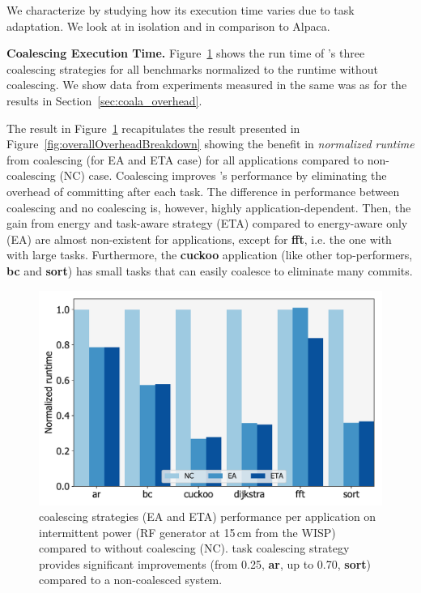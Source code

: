 We characterize \sys by studying how its execution time varies due to task adaptation. We look at \sys in isolation and in comparison to Alpaca.

\textbf{\sys Coalescing Execution Time.}  Figure~\ref{fig:coalescing} shows the run time of \sys's three coalescing strategies for all benchmarks normalized to the \sys runtime without coalescing. We show data from experiments measured in the same was as for the results in Section~\ref{sec:coala_overhead}. 

The result in Figure~\ref{fig:coalescing} recapitulates the result presented in Figure~\ref{fig:overallOverheadBreakdown} showing the benefit in \emph {normalized runtime} from coalescing (for EA and ETA case) for all applications compared to non-coalescing (NC) case. Coalescing improves \sys's performance by eliminating the overhead of committing after each task. The difference in performance between coalescing and no coalescing is, however, highly application-dependent. Then, the gain from energy and task-aware strategy (ETA) compared to energy-aware only (EA) are almost non-existent for applications, except for \textbf{fft}, i.e. the one with with large tasks. Furthermore, the \textbf{cuckoo} application (like other top-performers, \textbf{bc} and \textbf{sort}) has small tasks that \sys can easily coalesce to eliminate many commits.

\begin{figure}
	\centering
	\includegraphics[width=0.5\columnwidth]{figures/coalStrategies}
	\caption{\sys coalescing strategies (EA and ETA) performance per application on intermittent power (RF generator at 15\,cm from the WISP) compared to \sys without coalescing (NC). \sys task coalescing strategy provides significant improvements (from 0.25, \textbf{ar}, up to 0.70, \textbf{sort}) compared to a non-coalesced system. }
	\label{fig:coalescing}
\end{figure}

